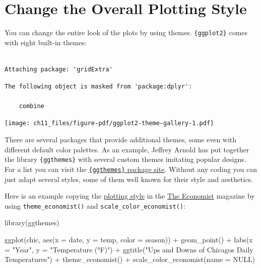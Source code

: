 \documentclass[
  letterpaper,
  DIV=11,
  numbers=noendperiod]{scrreprt}
\newenvironment{Shaded}{\begin{snugshade}}{\end{snugshade}}
\newcommand{\AttributeTok}[1]{\textcolor[rgb]{0.40,0.45,0.13}{#1}}
\newcommand{\ConstantTok}[1]{\textcolor[rgb]{0.56,0.35,0.01}{#1}}
\newcommand{\FunctionTok}[1]{\textcolor[rgb]{0.28,0.35,0.67}{#1}}
\newcommand{\NormalTok}[1]{\textcolor[rgb]{0.00,0.23,0.31}{#1}}
\newcommand{\SpecialCharTok}[1]{\textcolor[rgb]{0.37,0.37,0.37}{#1}}
\newcommand{\StringTok}[1]{\textcolor[rgb]{0.13,0.47,0.30}{#1}}
\begin{document}
\section{Change the Overall Plotting
Style}\label{change-the-overall-plotting-style}

You can change the entire look of the plots by using themes.
\texttt{\{ggplot2\}} comes with eight built-in themes:

\begin{verbatim}

Attaching package: 'gridExtra'
\end{verbatim}

\begin{verbatim}
The following object is masked from 'package:dplyr':

    combine
\end{verbatim}

\texttt{[image: ch11\_files/figure-pdf/ggplot2-theme-gallery-1.pdf]}

There are several packages that provide additional themes, some even
with different default color palettes. As an example, Jeffrey Arnold has
put together the library \texttt{\{ggthemes\}} with several custom
themes imitating popular designs. For a list you can visit the
\href{https://github.com/jrnold/ggthemes}{\texttt{\{ggthemes\}} package
site}. Without any coding you can just adapt several styles, some of
them well known for their style and aesthetics.

Here is an example copying the
\href{https://www.google.de/search?q=economist+graphic&tbm=isch}{plotting
style} in the \href{http://www.economist.com/}{The Economist} magazine
by using \texttt{theme\_economist()} and
\texttt{scale\_color\_economist()}:

\begin{Shaded}
\begin{Highlighting}[]
\FunctionTok{library}\NormalTok{(ggthemes)}

\FunctionTok{ggplot}\NormalTok{(chic, }\FunctionTok{aes}\NormalTok{(}\AttributeTok{x =}\NormalTok{ date, }\AttributeTok{y =}\NormalTok{ temp, }\AttributeTok{color =}\NormalTok{ season)) }\SpecialCharTok{+}
  \FunctionTok{geom\_point}\NormalTok{() }\SpecialCharTok{+}
  \FunctionTok{labs}\NormalTok{(}\AttributeTok{x =} \StringTok{"Year"}\NormalTok{, }\AttributeTok{y =} \StringTok{"Temperature (°F)"}\NormalTok{) }\SpecialCharTok{+}
  \FunctionTok{ggtitle}\NormalTok{(}\StringTok{"Ups and Downs of Chicago\textquotesingle{}s Daily Temperatures"}\NormalTok{) }\SpecialCharTok{+}
  \FunctionTok{theme\_economist}\NormalTok{() }\SpecialCharTok{+}
  \FunctionTok{scale\_color\_economist}\NormalTok{(}\AttributeTok{name =} \ConstantTok{NULL}\NormalTok{)}
\end{Highlighting}
\end{Shaded}
\end{document}
